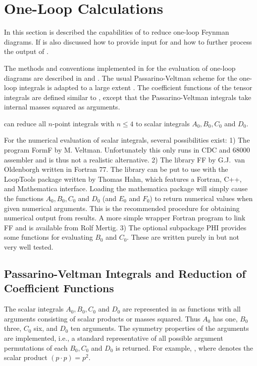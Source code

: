 \section{One-Loop Calculations}

In this section is described the capabilities of \fc to reduce one-loop Feynman diagrams. If is also discussed how to provide input for \fc and how to further process the output of \fc.

The methods and conventions implemented in \fc for the evaluation of one-loop diagrams are described in \cite{ansgar} and \cite{feyncalc}. The usual Passarino-Veltman scheme for the one-loop integrals is adapted to a large extent \cite{ansgar}.  The coefficient functions of the  tensor integrals are defined  similar to \cite{ansgar}, except that the Passarino-Veltman integrals take internal masses squared  as arguments.

\fc can reduce all $n$-point integrals with $n\leq 4$ to scalar integrals $A_0, B_0, C_0$ and $D_0$.

For the numerical evaluation of scalar integrals, several possibilities exist: 1) The program FormF by M. Veltman. Unfortunately this only runs in CDC and 68000 assembler and is thus not a realistic alternative. 2) The library FF by G.J.~van Oldenborgh \cite{Ol91} written in Fortran 77. The library can be put to use with the LoopTools package \cite{Hahn:1998yk} written by Thomas Hahn, which features a Fortran, C++, and Mathematica interface. Loading the mathematica package will simply cause the functions $A_0, B_0, C_0$ and $D_0$ (and $E_0$ and $F_0$) to return numerical values when given numerical arguments. This is the recommended procedure for obtaining numerical output from \fc results. A more simple wrapper Fortran program to link FF and \fc is available from Rolf Mertig. 3) The optional subpackage PHI provides some functions for evaluating $B_0$ and $C_0$. These are written purely in \mma but not very well tested.

\subsection{Passarino-Veltman Integrals and Reduction of Coefficient Functions}
\label{passvelt}

The scalar integrals $A_0, B_0, C_0$ and $D_0$ are represented
in \fc as functions with all arguments consisting of scalar products or 
masses squared. Thus $A_0$ has one, $B_0$ three, $C_0$ six, and 
$D_0$ ten arguments. The symmetry properties of the arguments  are 
implemented, i.e., a standard representative of all possible 
argument permutations of each $ B_0, C_0$ and $D_0$ is returned.
For example,  \ra {}, where 
 denotes the scalar product $(p\cdot p) = p^2$.

